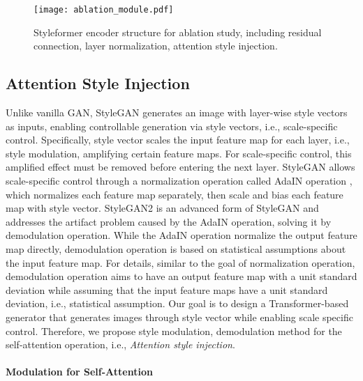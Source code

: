 \documentclass[10pt,twocolumn,letterpaper]{article}
\begin{document}
\begin{figure}[t]
\begin{center}

\texttt{[image: ablation\_module.pdf]}
\end{center}
\vspace{-5mm}
   \caption{Styleformer encoder structure for ablation study, including residual connection, layer normalization, attention style injection.
}
\vspace{-3mm}
\label{fig:ablation}
\end{figure}


\subsection{Attention Style Injection}
\label{section:3-3}
Unlike vanilla GAN, StyleGAN generates an image with layer-wise style vectors as inputs, enabling controllable generation via style vectors, i.e., scale-specific control. Specifically, style vector scales the input feature map for each layer, i.e., style modulation, amplifying certain feature maps. For scale-specific control, this amplified effect must be removed before entering the next layer. StyleGAN allows scale-specific control through a normalization operation called AdaIN operation \cite{huang2017arbitrary, dumoulin2017learned, ghiasi2017exploring, dumoulin2018feature-wise}, which normalizes each feature map separately, then scale and bias each feature map with style vector. StyleGAN2 is an advanced form of StyleGAN and addresses the artifact problem caused by the AdaIN operation, solving it by demodulation operation. While the AdaIN operation normalize the output feature map directly, demodulation operation is based on statistical assumptions about the input feature map. For details, similar to the goal of normalization operation, demodulation operation aims to have an output feature map with a unit standard deviation while assuming that the input feature maps have a unit standard deviation, i.e., statistical assumption. Our goal is to design a Transformer-based generator that generates images through style vector while enabling scale specific control. Therefore, we propose style modulation, demodulation method for the self-attention operation, i.e., \textit{Attention style injection}.
\paragraph{Modulation for Self-Attention}
\end{document}
